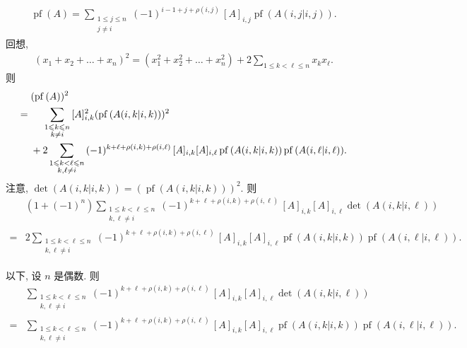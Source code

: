 \documentclass[../libro.tex]{subfiles}
\begin{document}
\begin{example}
\begin{align*}
        \operatorname{pf} {(A)}
        =
        \sum_{\substack{1 \leq j \leq n \\ j \neq i}}
        {
            (-1)^{i-1+j+\rho(i,j)}\, [A]_{i,j}
        \operatorname{pf} {(A({i,j}|{i,j}))}}.
    \end{align*}
    回想,
    \begin{align*}
        (x_1 + x_2 + \dots + x_n)^2
        = (x_1^2 + x_2^2 + \dots + x_n^2)
        + 2 \sum_{1 \leq k < \ell \leq n} {x_k x_\ell}.
    \end{align*}
    则
    \begin{align*}
        &
        (\operatorname{pf} {(A)})^2
        \\
        = {} &
        \hphantom{{} + {}}
        \sum_{\substack{
                1 \leq k \leq n \\
        k \neq i}}
        {[A]_{i,k}^2
        (\operatorname{pf} {(A({i,k}|{i,k}))})^2}
        \\
        &
        +
        2
        \sum_{\substack{
                1 \leq k < \ell \leq n \\
        k, \ell \neq i}}
        {
            (-1)^{k+\ell+\rho(i,k)+\rho(i,\ell)}\,
            [A]_{i,k} [A]_{i,\ell}
            \operatorname{pf} {(A({i,k}|{i,k}))}
            \operatorname{pf} {(A({i,\ell}|{i,\ell}))}
        }.
    \end{align*}
    注意, \(\det {(A({i,k}|{i,k}))}
    = (\operatorname{pf} {(A({i,k}|{i,k}))})^2\).
    则
    \begin{align*}
        &
        (1 + (-1)^n)
        \sum_{\substack{
                1 \leq k < \ell \leq n \\
        k, \ell \neq i}}
        {(-1)^{k+\ell+\rho(i,k)+\rho(i,\ell)}\,
        [A]_{i,k} [A]_{i,\ell} \det {(A({i,k}|{i,\ell}))}}
        \\
        = {} &
        2
        \sum_{\substack{
                1 \leq k < \ell \leq n \\
        k, \ell \neq i}}
        {
            (-1)^{k+\ell+\rho(i,k)+\rho(i,\ell)}\,
            [A]_{i,k} [A]_{i,\ell}
            \operatorname{pf} {(A({i,k}|{i,k}))}
            \operatorname{pf} {(A({i,\ell}|{i,\ell}))}
        }.
    \end{align*}

    以下, 设 \(n\) 是偶数.
    则
    \begin{align*}
        &
        \sum_{\substack{
                1 \leq k < \ell \leq n \\
        k, \ell \neq i}}
        {(-1)^{k+\ell+\rho(i,k)+\rho(i,\ell)}\,
        [A]_{i,k} [A]_{i,\ell} \det {(A({i,k}|{i,\ell}))}}
        \\
        = {} &
        \sum_{\substack{
                1 \leq k < \ell \leq n \\
        k, \ell \neq i}}
        {
            (-1)^{k+\ell+\rho(i,k)+\rho(i,\ell)}\,
            [A]_{i,k} [A]_{i,\ell}
            \operatorname{pf} {(A({i,k}|{i,k}))}
            \operatorname{pf} {(A({i,\ell}|{i,\ell}))}
        }.
    \end{align*}


\end{example}
\end{document}
